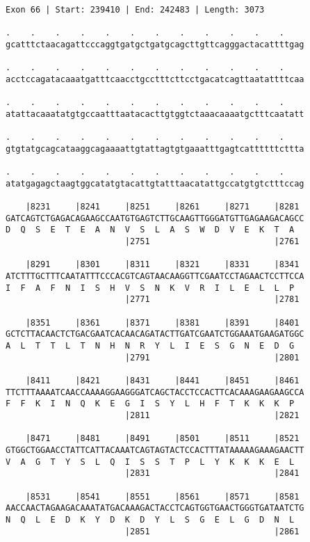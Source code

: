 \documentclass{article}
\begin{document}
\newpage
\begin{Verbatim}
Exon 66 | Start: 239410 | End: 242483 | Length: 3073
 
.    .    .    .    .    .    .    .    .    .    .    .    
gcatttctaacagattcccaggtgatgctgatgcagcttgttcagggactacattttgag
  
.    .    .    .    .    .    .    .    .    .    .    .    
acctccagatacaaatgatttcaacctgcctttcttcctgacatcagttaatattttcaa
  
.    .    .    .    .    .    .    .    .    .    .    .    
atattacaaatatgtgccaatttaatacacttgtggtctaaacaaaatgctttcaatatt
  
.    .    .    .    .    .    .    .    .    .    .    .    
gtgtatgcagcataaggcagaaaattgtattagtgtgaaatttgagtcattttttcttta
  
.    .    .    .    .    .    .    .    .    .    .    .    
atatgagagctaagtggcatatgtacattgtatttaacatattgccatgtgtctttccag
  
    |8231     |8241     |8251     |8261     |8271     |8281 
GATCAGTCTGAGACAGAAGCCAATGTGAGTCTTGCAAGTTGGGATGTTGAGAAGACAGCC
D  Q  S  E  T  E  A  N  V  S  L  A  S  W  D  V  E  K  T  A  
                        |2751                         |2761 
  
    |8291     |8301     |8311     |8321     |8331     |8341 
ATCTTTGCTTTCAATATTTCCCACGTCAGTAACAAGGTTCGAATCCTAGAACTCCTTCCA
I  F  A  F  N  I  S  H  V  S  N  K  V  R  I  L  E  L  L  P  
                        |2771                         |2781 
  
    |8351     |8361     |8371     |8381     |8391     |8401 
GCTCTTACAACTCTGACGAATCACAACAGATACTTGATCGAATCTGGAAATGAAGATGGC
A  L  T  T  L  T  N  H  N  R  Y  L  I  E  S  G  N  E  D  G  
                        |2791                         |2801 
  
    |8411     |8421     |8431     |8441     |8451     |8461 
TTCTTTAAAATCAACCAAAAGGAAGGGATCAGCTACCTCCACTTCACAAAGAAGAAGCCA
F  F  K  I  N  Q  K  E  G  I  S  Y  L  H  F  T  K  K  K  P  
                        |2811                         |2821 
  
    |8471     |8481     |8491     |8501     |8511     |8521 
GTGGCTGGAACCTATTCATTACAAATCAGTAGTACTCCACTTTATAAAAAGAAAGAACTT
V  A  G  T  Y  S  L  Q  I  S  S  T  P  L  Y  K  K  K  E  L  
                        |2831                         |2841 
  
    |8531     |8541     |8551     |8561     |8571     |8581 
AACCAACTAGAAGACAAATATGACAAAGACTACCTCAGTGGTGAACTGGGTGATAATCTG
N  Q  L  E  D  K  Y  D  K  D  Y  L  S  G  E  L  G  D  N  L  
                        |2851                         |2861 
  

\end{Verbatim}
\end{document}
